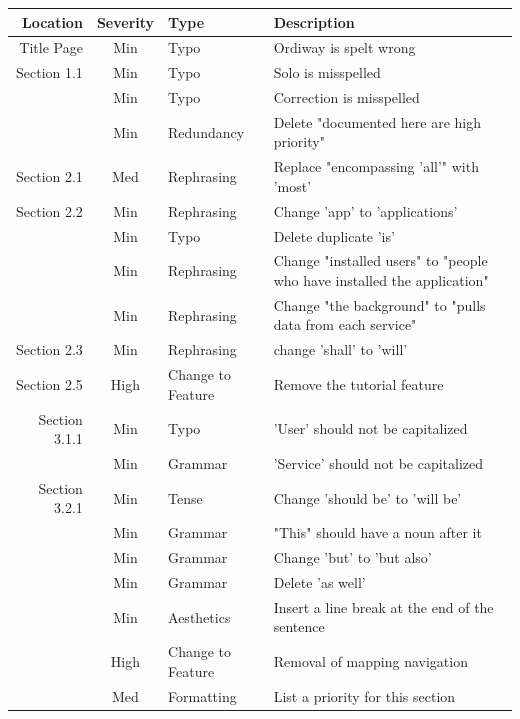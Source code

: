 \documentclass[pdftex,12pt,letter]{article}
\begin{document}
\begin{flushleft}
{\small 
\begin{tabular}{|r|c|l|p{6cm}|}
    \hline
Location & Severity & Type & Description \\
  \hline
  Title Page & Min & Typo & Ordiway is spelt wrong \\
    \hline
  Section 1.1 & Min & Typo & Solo is misspelled \\
   & Min & Typo & Correction is misspelled \\
   & Min & Redundancy  &  Delete "documented here are high priority" \\
  \hline
  Section 2.1 & Med & Rephrasing & Replace "encompassing 'all'" with 'most'\\
  \hline
  Section 2.2 & Min & Rephrasing & Change 'app' to 'applications'\\
    & Min & Typo & Delete duplicate 'is'\\
    & Min & Rephrasing & Change "installed users" to "people who have installed the application"\\
    & Min & Rephrasing & Change "the background" to "pulls data from each service"\\
\hline
	Section 2.3 & Min & Rephrasing & change 'shall' to 'will'\\
	\hline
	Section 2.5 & High & Change to Feature & Remove the tutorial feature\\
	\hline
Section 3.1.1 & Min & Typo & 'User' should not be capitalized\\
 & Min & Grammar & 'Service' should not be capitalized\\
\hline
Section 3.2.1 & Min & Tense & Change 'should be' to 'will be'\\
& Min & Grammar & "This" should have a noun after it\\
& Min & Grammar & Change 'but' to 'but also'\\
& Min & Grammar & Delete 'as well'\\
& Min & Aesthetics & Insert a line break at the end of the sentence\\
& High & Change to Feature & Removal of mapping navigation\\
& Med & Formatting & List a priority for this section\\
\hline
\end{tabular}
}
\newpage


\end{flushleft}
\end{document}
